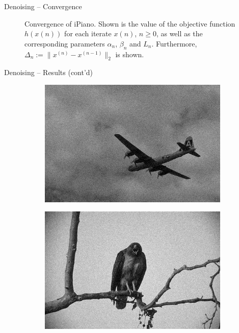\documentclass[t]{beamer}
\begin{document}
\begin{frame}{Denoising -- Convergence}
\begin{figure}
\begin{subfigure}[t]{0.9\textwidth}
	\end{subfigure}
	\caption{Convergence of iPiano. Shown is the value of the objective function $h(x{(n)})$ for each iterate $x{(n)}$, $n \geq 0$, as well as the corresponding parameters $\alpha_n$, $\beta_n$ and $L_n$. Furthermore, $\Delta_n := \|x^{(n)} - x^{(n - 1)}\|_2$ is shown.}
	\end{figure}
	\end{frame}
	
	\begin{frame}{Denoising -- Results (cont'd)}
		\begin{figure}[h]
			\centering
			\begin{subfigure}[t]{0.25\textwidth}
				\includegraphics[scale=0.175]{../paper/pictures/denoising/image/3096_tilde.png}
			\end{subfigure}
			\begin{subfigure}[t]{0.25\textwidth}
				\includegraphics[scale=0.175]{../paper/pictures/denoising/image/42049_tilde.png}

\end{subfigure}
\end{figure}
\end{frame}
\end{document}
